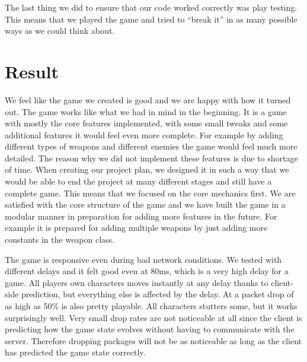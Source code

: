 \documentclass[a4paper]{article}
\begin{document}
The last thing we did to ensure that our code worked correctly was play testing. This means that we played the game and tried to ``break it'' in as many possible ways as we could think about.

\section{Result}

We feel like the game we created is good and we are happy with how it turned out. The game works like what we had in mind in the beginning. It is a game with mostly the core features implemented, with some small tweaks and some additional features it would feel even more complete. For example by adding different types of weapons and different enemies the game would feel much more detailed. The reason why we did not implement these features is due to shortage of time. When creating our project plan, we designed it in such a way that we would be able to end the project at many different stages and still have a complete game. This means that we focused on the core mechanics first. We are satisfied with the core structure of the game and we have built the game in a modular manner in preparation for adding more features in the future. For example it is prepared for adding multiple weapons by just adding more constants in the weapon class.

The game is responsive even during bad network conditions. We tested with different delays and it felt good even at 80ms, which is a very high delay for a game. All players own characters moves instantly at any delay thanks to client-side prediction, but everything else is affected by the delay. At a packet drop of as high as 50\% is also pretty playable. All characters stutters some, but it works surprisingly well. Very small drop rates are not noticeable at all since the client is predicting how the game state evolves without having to communicate with the server. Therefore dropping packages will not be as noticeable as long as the client has predicted the game state correctly.
\end{document}
